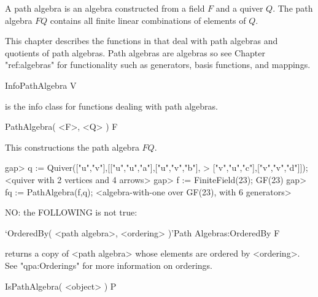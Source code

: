 %
%
%

A path algebra is an algebra
constructed from a field $F$ and a quiver $Q$.
The path algebra $FQ$ contains all finite linear combinations
of elements of $Q$.

This chapter describes the functions in {\QPA} that deal with path algebras
and quotients of path algebras.  Path algebras are algebras so see Chapter 
"ref:algebras" for functionality such as generators, basis functions, and mappings.

\>InfoPathAlgebra V

is the info class for functions dealing with path algebras.



\>PathAlgebra( <F>, <Q> ) F

This constructions the path algebra $FQ$.

\beginexample 
gap> q := Quiver(["u","v"],[["u","u","a"],["u","v","b"],
> ["v","u","c"],["v","v","d"]]);
<quiver with 2 vertices and 4 arrows>
gap> f := FiniteField(23);
GF(23)
gap> fq := PathAlgebra(f,q);
<algebra-with-one over GF(23), with 6 generators>
\endexample

\* NO: the FOLLOWING is not true:

\>`OrderedBy( <path algebra>, <ordering> )'{Path Algebras:OrderedBy} F

returns a copy of <path algebra> whose elements are ordered
by <ordering>.
See "qpa:Orderings" for more information on orderings.


\>IsPathAlgebra( <object> ) P


